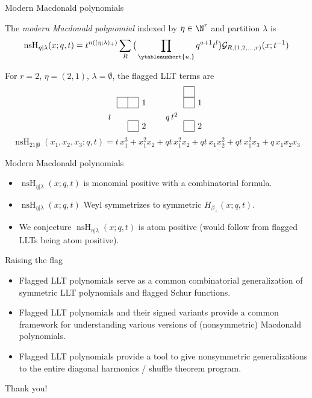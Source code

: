 \documentclass[dvipsnames]{beamer}
\newcommand{\Gcal}{{\mathcal G}}
\newcommand{\nsH}{\operatorname{nsH}}
\theoremstyle{definition}
\newcounter{c}
\begin{document}
\begin{frame}{Modern Macdonald polynomials }
  \begin{definition}
    The \emph{modern Macdonald polynomial} indexed by \(\eta \in
    \N^r\) and partition \(\lambda\) is
    \[
      \nsH_{\eta|\lambda}(x;q,t) = t^{n((\eta;\lambda)_+)} \sum_R \big(\prod_{\ytableaushort{u,{}}} q^{a+1}
        t^l \big)
      \Gcal_{R,(1,2,\ldots,r)}(x;t^{-1})
    \]
  \end{definition}
    For \(r=2\), \(\eta=(2,1)\), \(\lambda = \emptyset\), the flagged LLT
    terms are
\begin{equation*}\label{e:H-HHL-ribbon-tuples}
\setlength{\arraycolsep}{0cm}
\begin{array}{cccc}
t \ \ &
\begin{tikzpicture}[scale=.45,baseline=.5cm]
  \foreach \beta / \alpha /  \z in {0/-1/0, 0/-2/2.2}
     \draw[yshift=\z cm] (\alpha,0)  grid (\beta, 1);
     \node at (.5,.5+2.2) {$1$};
     \node at (.5,.5) {$2$};
      \end{tikzpicture}
& \qquad q\, t^{2} \ \ &
\begin{tikzpicture}[scale=.45,baseline=.5cm]
  \foreach \beta / \alpha /  \z in {0/-1/0, 0/-1/2.2, 0/-1/3.2}
     \draw[yshift=\z cm] (\alpha,0)  grid (\beta, 1);
     \node at (.5,.5+2.2)  {$1$};
     \node at (.5,.5) {$2$};
      \end{tikzpicture}
\end{array}
\end{equation*}
\[
\nsH_{21|\emptyset}(x_1,x_2,x_3;q,t) = t\,x_1^3  +  x_1^2x_2  +
qt\,x_1^2x_2  +  qt\,x_1x_2^2  +  qt\,x_1^2x_3 +  q\,x_1x_2x_3
\]
\end{frame}
\begin{frame}{Modern Macdonald polynomials}
  \begin{itemize}
  \item \(\nsH_{\eta | \lambda}(x;q,t)\) is monomial positive with a
    combinatorial formula.\pause
  \item \(\nsH_{\eta | \lambda}(x;q,t)\) Weyl symmetrizes to symmetric
    \(H_{\beta_+}(x;q,t)\).\pause
  \item We conjecture \(\nsH_{\eta | \lambda}(x;q,t)\) is atom positive
    (would follow from flagged LLTs being atom positive).
  \end{itemize}
\end{frame}
\begin{frame}{Raising the flag}
  \begin{itemize}
  \item Flagged LLT polynomials serve as a common combinatorial generalization of
    symmetric LLT polynomials and flagged Schur functions.\pause
  \item Flagged LLT polynomials and their signed variants provide a
    common framework for understanding various versions of
    (nonsymmetric) Macdonald polynomials.\pause
  \item Flagged LLT polynomials provide a tool to give 
    nonsymmetric generalizations to the entire diagonal harmonics /
    shuffle theorem program.\pause
  \end{itemize}
  Thank you!
\end{frame}
\end{document}
